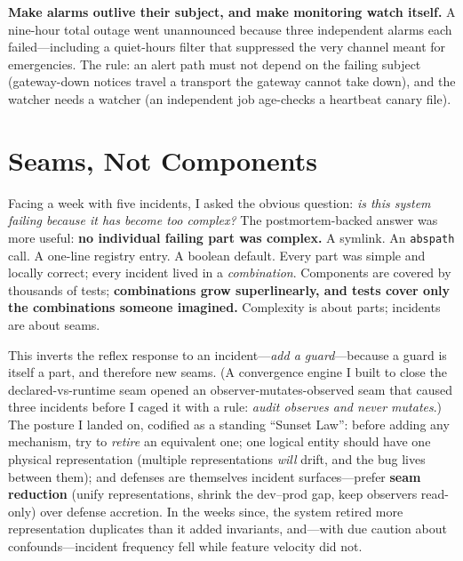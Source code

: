 \documentclass[10pt,journal]{IEEEtran}
\begin{document}
\textbf{Make alarms outlive their subject, and make monitoring watch itself.} A
nine-hour total outage went unannounced because three independent alarms each
failed---including a quiet-hours filter that suppressed the very channel meant
for emergencies. The rule: an alert path must not depend on the failing subject
(gateway-down notices travel a transport the gateway cannot take down), and the
watcher needs a watcher (an independent job age-checks a heartbeat canary
file).

\section{Seams, Not Components}
Facing a week with five incidents, I asked the obvious question: \emph{is this
system failing because it has become too complex?} The postmortem-backed answer
was more useful: \textbf{no individual failing part was complex.} A symlink. An
\texttt{abspath} call. A one-line registry entry. A boolean default. Every part
was simple and locally correct; every incident lived in a \emph{combination}.
Components are covered by thousands of tests; \textbf{combinations grow
superlinearly, and tests cover only the combinations someone imagined.}
Complexity is about parts; incidents are about seams.

This inverts the reflex response to an incident---\emph{add a guard}---because a
guard is itself a part, and therefore new seams. (A convergence engine I built
to close the declared-vs-runtime seam opened an observer-mutates-observed seam
that caused three incidents before I caged it with a rule: \emph{audit observes
and never mutates}.) The posture I landed on, codified as a standing ``Sunset
Law'': before adding any mechanism, try to \emph{retire} an equivalent one; one
logical entity should have one physical representation (multiple representations
\emph{will} drift, and the bug lives between them); and defenses are themselves
incident surfaces---prefer \textbf{seam reduction} (unify representations,
shrink the dev--prod gap, keep observers read-only) over defense accretion. In
the weeks since, the system retired more representation duplicates than it added
invariants, and---with due caution about confounds---incident frequency fell
while feature velocity did not.
\end{document}
